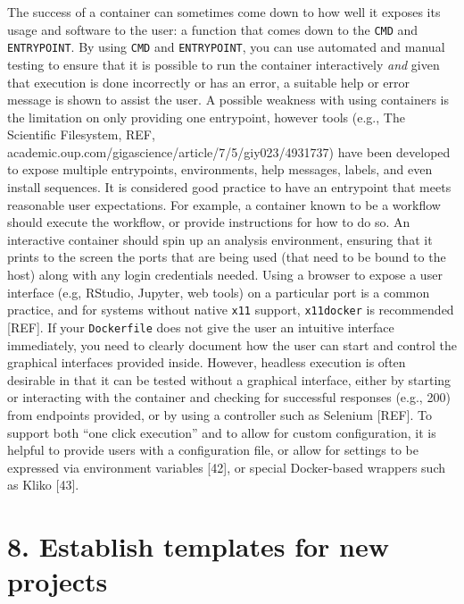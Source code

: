 \documentclass[10pt,letterpaper]{article}
\begin{document}
The success of a container can sometimes come down to how well it
exposes its usage and software to the user: a function that comes down
to the \texttt{CMD} and \texttt{ENTRYPOINT}. By using \texttt{CMD} and
\texttt{ENTRYPOINT}, you can use automated and manual testing to ensure
that it is possible to run the container interactively \emph{and} given
that execution is done incorrectly or has an error, a suitable help or
error message is shown to assist the user. A possible weakness with
using containers is the limitation on only providing one entrypoint,
however tools (e.g., The Scientific Filesystem, REF,
academic.oup.com/gigascience/article/7/5/giy023/4931737) have been
developed to expose multiple entrypoints, environments, help messages,
labels, and even install sequences. It is considered good practice to
have an entrypoint that meets reasonable user expectations. For example,
a container known to be a workflow should execute the workflow, or
provide instructions for how to do so. An interactive container should
spin up an analysis environment, ensuring that it prints to the screen
the ports that are being used (that need to be bound to the host) along
with any login credentials needed. Using a browser to expose a user
interface (e.g, RStudio, Jupyter, web tools) on a particular port is a
common practice, and for systems without native \texttt{x11} support,
\texttt{x11docker} is recommended {[}REF{]}. If your \texttt{Dockerfile}
does not give the user an intuitive interface immediately, you need to
clearly document how the user can start and control the graphical
interfaces provided inside. However, headless execution is often
desirable in that it can be tested without a graphical interface, either
by starting or interacting with the container and checking for
successful responses (e.g., 200) from endpoints provided, or by using a
controller such as Selenium {[}REF{]}. To support both ``one click
execution'' and to allow for custom configuration, it is helpful to
provide users with a configuration file, or allow for settings to be
expressed via environment variables {[}42{]}, or special Docker-based
wrappers such as Kliko {[}43{]}.

\hypertarget{establish-templates-for-new-projects}{%
\section*{8. Establish templates for new
projects}\label{establish-templates-for-new-projects}}
\end{document}

